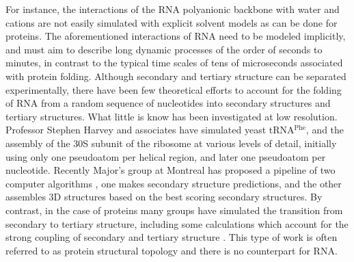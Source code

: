 For instance,  the interactions of  the RNA polyanionic  backbone with
water  and cations  \cite{klein2004a}  are not  easily simulated  with
explicit   solvent  models   as  can   be  done   for   proteins.  The
aforementioned interactions of RNA  need to be modeled implicitly, and
must aim to describe long dynamic processes of the order of seconds to
minutes,  in  contrast   to  the  typical  time  scales   of  tens  of
microseconds associated with protein folding.
Although   secondary   and  tertiary   structure   can  be   separated
experimentally, there have been few theoretical efforts to account for
the  folding  of  RNA  from  a random  sequence  of  nucleotides  into
secondary structures and tertiary  structures. What little is know has
been  investigated at  low  resolution. Professor  Stephen Harvey  and
associates     have     simulated     yeast     tRNA$^{\textrm{Phe}}$,
\cite{malhotra1990}  and  the  assembly  of  the 30S  subunit  of  the
ribosome \cite{stagg2003} at various levels of detail, initially using
only one pseudoatom  per helical region, and later  one pseudoatom per
nucleotide. Recently Major's group at Montreal has proposed a pipeline
of  two computer algorithms  \cite{parisien2008}, one  makes secondary
structure predictions, and the  other assembles 3D structures based on
the best scoring  secondary structures.
By contrast,  in the case of  proteins many groups  have simulated the
transition  from  secondary  to  tertiary  structure,  including  some
calculations which  account for the  strong coupling of  secondary and
tertiary  structure   \cite{westhead1999,  gerstein2003,  meiler2003}.
This type of work is  often referred to as protein structural topology
and there is no counterpart for RNA.

